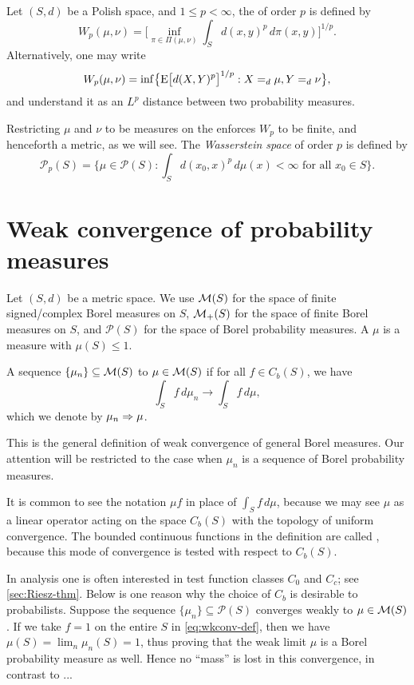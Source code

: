 Let $(S,d)$ be a Polish space, and $1\leq p < \infty$, the  of order $p$ is defined by \[
    W_p(\mu,\nu) = \biggl[\inf_{\pi \in \Pi(\mu,\nu)} \int_S d(x,y)^p \,d\pi(x,y)\biggr]^{1/p}.
\] Alternatively, one may write \[
    W_p(\mu,\nu) = \inf\bigl\{\mathop{}\!\mathrm{E} \bigl[d(X,Y)^p\bigr]^{1/p} : X =_d \mu, Y =_d \nu\bigr\}, 
\] and understand it as an $L^p$ distance between two probability measures.

Restricting $\mu$ and $\nu$ to be measures on the  enforces $W_p$ to be finite, and henceforth a metric, as we will see. The \emph{Wasserstein space} of order $p$ is defined by \[
    \mathcal P_p(S) = \biggl\{\mu \in \mathcal{P}(S): \int_S d(x_0,x)^p \,d\mu(x) < \infty \text{ for all }x_0\in S\biggr\}.
\]

\section{Weak convergence of probability measures}
Let $(S,d)$ be a metric space. We use $\mathcal{M}(S)$ for the space of finite signed/complex Borel measures on $S$, $\mathcal{M}_+(S)$ for the space of finite Borel measures on $S$, and $\mathcal P(S)$ for the space of Borel probability measures. A  $\mu$ is a measure with $\mu(S) \leq 1$.
\begin{defn}
    A sequence $\{\mu_n\} \subseteq \mathcal{M}(S)$  to $\mu\in \mathcal{M}(S)$ if for all $f\in C_b(S)$, we have \begin{equation}
        \int_S f\,d\mu_n \to \int_S f\,d\mu, \label{eq:wkconv-def}
    \end{equation}
    which we denote by $\mu_n \Rightarrow \mu$.
\end{defn}

This is the general definition of weak convergence of general Borel measures. Our attention will be restricted to the case when ${\mu_n}$ is a sequence of Borel probability measures.

It is common to see the notation $\mu f$ in place of $\int_S f\,d\mu$, because we may see $\mu$ as a linear operator acting on the space $C_b(S)$ with the topology of uniform convergence. The bounded continuous functions in the definition are called , because this mode of convergence is tested with respect to $C_b(S)$.

In analysis one is often interested in test function classes $C_0$ and $C_c$; see \cref{sec:Riesz-thm}. Below is one reason why the choice of $C_b$ is desirable to probabilists. Suppose the sequence $\{\mu_n\} \subseteq \mathcal{P}(S)$ converges weakly to $\mu\in \mathcal{M}(S)$. If we take $f = 1$ on the entire $S$ in \eqref{eq:wkconv-def}, then we have $\mu(S) = \lim_n \mu_n(S) = 1$, thus proving that the weak limit $\mu$ is a Borel probability measure as well. Hence no ``mass'' is lost in this convergence, in contrast to ...

